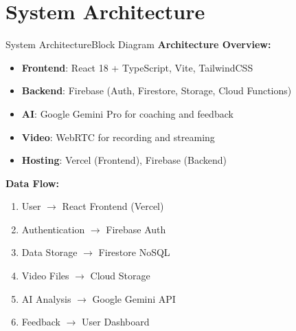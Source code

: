 \documentclass{beamer}
\begin{document}
\section{System Architecture}
\begin{frame}{System Architecture}{Block Diagram}
\textbf{Architecture Overview:}
\begin{itemize}
    \item \textbf{Frontend}: React 18 + TypeScript, Vite, TailwindCSS
    \item \textbf{Backend}: Firebase (Auth, Firestore, Storage, Cloud Functions)
    \item \textbf{AI}: Google Gemini Pro for coaching and feedback
    \item \textbf{Video}: WebRTC for recording and streaming
    \item \textbf{Hosting}: Vercel (Frontend), Firebase (Backend)
\end{itemize}

\vspace{3pt}

\textbf{Data Flow:}
\begin{enumerate}
    \item User $\rightarrow$ React Frontend (Vercel)
    \item Authentication $\rightarrow$ Firebase Auth
    \item Data Storage $\rightarrow$ Firestore NoSQL
    \item Video Files $\rightarrow$ Cloud Storage
    \item AI Analysis $\rightarrow$ Google Gemini API
    \item Feedback $\rightarrow$ User Dashboard
\end{enumerate}
\end{frame}

\end{document}
